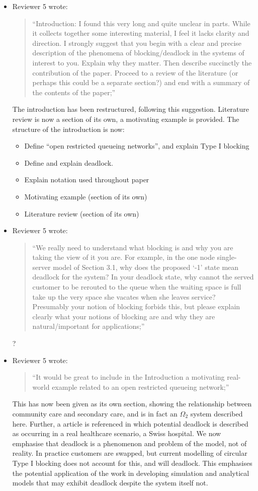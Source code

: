 \documentclass{article}
\begin{document}
\begin{itemize}
\item Reviewer 5 wrote:
\begin{quote}
``Introduction: I found this very long and quite unclear in parts.
While it collects together some interesting material, I feel it lacks clarity
and direction.
I strongly suggest that you begin with a clear and precise description of the
phenomena of blocking/deadlock in the systems of interest to you.
Explain why they matter.
Then describe succinctly the contribution of the paper.
Proceed to a review of the literature (or perhaps this could be a separate
section?) and end with a summary of the contents of the paper;''
\end{quote}
The introduction has been restructured, following this suggestion.
Literature review is now a section of its own, a motivating example is
provided.
The structure of the introduction is now:
\begin{itemize}
\item Define ``open restricted queueing networks'', and explain Type I blocking
\item Define and explain deadlock.
\item Explain notation used throughout paper
\item Motivating example (section of its own)
\item Literature review (section of its own)
\end{itemize}

\item Reviewer 5 wrote:
\begin{quote}
``We really need to understand what blocking is and why you are taking the
view of it you are.
For example, in the one node single-server model of Section 3.1, why does the
proposed ‘-1’ state mean deadlock for the system?
In your deadlock state, why cannot the served customer to be rerouted to the
queue when the waiting space is full take up the very space she vacates when
she leaves service?
Presumably your notion of blocking forbids this, but please explain clearly
what your notions of blocking are and why they are natural/important for
applications;''
\end{quote}
?

\item Reviewer 5 wrote:
\begin{quote}
``It would be great to include in the Introduction a motivating real-world
example related to an open restricted queueing network;''
\end{quote}
This has now been given as its own section, showing the relationship between
community care and secondary care, and is in fact an $\Omega_2$ system
described here.
Further, a article is referenced in which potential deadlock is described as
occurring in a real healthcare scenario, a Swiss hospital.
We now emphasise that deadlock is a phenomenon and problem of the model, not
of reality.
In practice customers are swapped, but current modelling of circular Type I
blocking does not account for this, and will deadlock.
This emphasises the potential application of the work in developing simulation
and analytical models that may exhibit deadlock despite the system itself not.



\end{itemize}
\end{document}
